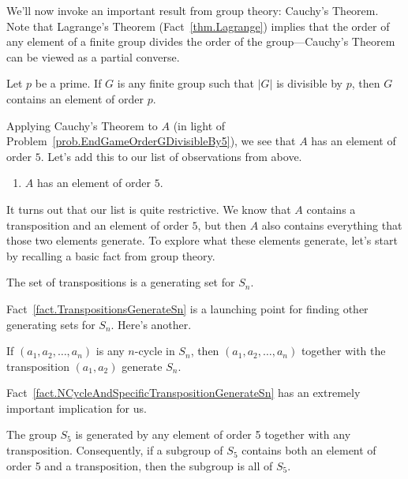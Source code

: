 We'll now invoke an important result from group theory: Cauchy's Theorem. Note that Lagrange's Theorem (Fact~\ref{thm.Lagrange}) implies that the order of any element of a finite group  divides the order of the group---Cauchy's Theorem can be viewed as a partial converse.

\begin{fact}
Let $p$ be a prime. If $G$ is any finite group such that $|G|$ is divisible by $p$, then  $G$ contains an element of order $p$.
\end{fact}

Applying Cauchy's Theorem to $A$ (in light of Problem~\ref{prob.EndGameOrderGDivisibleBy5}), we see that $A$ has an element of order $5$. Let's add this to our list of observations from above.

\begin{enumerate}[start = 3, label = \textbf{\Roman*.}]
\item $A$ has an element of order $5$.
\end{enumerate}

It turns out that our list is quite restrictive. We know that $A$ contains a transposition and an element of order $5$, but then $A$ also contains everything that those two elements generate. To explore what these elements generate, let's start by recalling  a basic fact from group theory. 

\begin{fact}\label{fact.TranspositionsGenerateSn}
The set of transpositions is a generating set for $S_n$. 
\end{fact}

Fact~\ref{fact.TranspositionsGenerateSn} is a launching point for finding other generating sets for $S_n$. Here's another.

\begin{fact}\label{fact.NCycleAndSpecificTranspositionGenerateSn}
If $(a_1,a_2,\ldots,a_n)$ is any $n$-cycle in $S_n$, then $(a_1,a_2,\ldots,a_n)$ together with the transposition $(a_1,a_2)$ generate $S_n$.
\end{fact}

Fact~\ref{fact.NCycleAndSpecificTranspositionGenerateSn} has an extremely important implication for us.

\begin{theorem}\label{thm.TranspositionAndOrder5GenerateS5}
The group $S_5$ is generated by any element of order 5 together with any transposition. Consequently, if a subgroup of $S_5$ contains both an element of order 5 and a transposition, then the subgroup is all of $S_5$.
\end{theorem}

